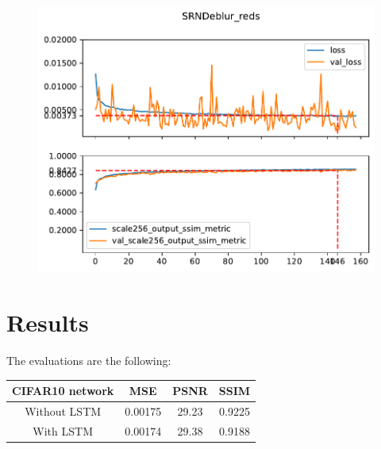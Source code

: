 \begin{figure}[H]
    \centering
    \includegraphics[scale=0.4]{subsections/srndeblur/plot_history_SRNDeblur_reds.pdf}
\end{figure}

\section{Results}
The evaluations are the following:

\begin{tabularx}{300pt}{cccc}
            CIFAR10 network & MSE & PSNR & SSIM \\
            \hline
            \textnormal{Without LSTM} & 0.00175 & 29.23 & 0.9225 \\
            \textnormal{With LSTM} & 0.00174 & 29.38 & 0.9188 \\
            \hline
\end{tabularx}

